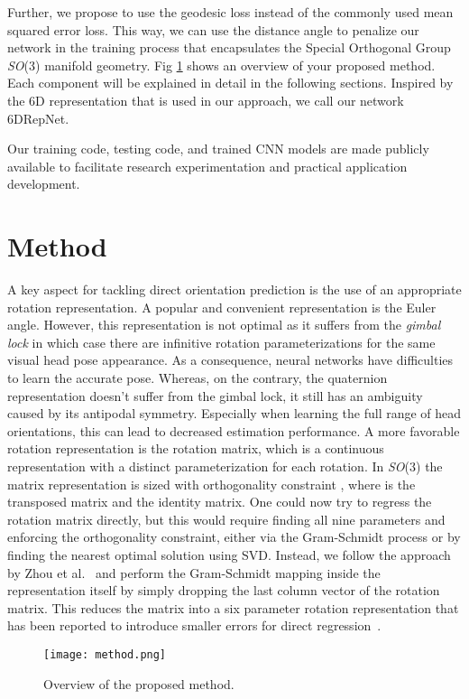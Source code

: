 \documentclass{article}
\newcommand\netname{6DRepNet}
\begin{document}
Further, we propose to use the geodesic loss instead of the commonly used mean squared error loss. This way, we can use the distance angle to penalize our network in the training process that encapsulates the Special Orthogonal Group \textit{SO}(3) manifold geometry. Fig \ref{fig:method} shows an overview of your proposed method. Each component will be explained in detail in the following sections. Inspired by the 6D representation that is used in our approach, we call our network \netname.

Our training code, testing code, and trained CNN models are made publicly available to facilitate research experimentation and practical application development.


\section{Method}
A key aspect for tackling direct orientation prediction is the use of an appropriate rotation representation. A popular and convenient representation is the Euler angle. However, this representation is not optimal as it suffers from the \textit{gimbal lock} in which case there are infinitive rotation parameterizations for the same visual head pose appearance. As a consequence, neural networks have difficulties to learn the accurate pose. Whereas, on the contrary, the quaternion representation doesn't suffer from the gimbal lock, it still has an ambiguity caused by its antipodal symmetry. Especially when learning the full range of head orientations, this can lead to decreased estimation performance. A more favorable rotation representation is the rotation matrix, which is a continuous representation with a distinct parameterization for each rotation. In \textit{SO}(3) the matrix representation  is sized  with orthogonality constraint , where  is the transposed matrix and  the identity matrix. One could now try to regress the rotation matrix directly, but this would require finding all nine parameters and enforcing the orthogonality constraint, either via the Gram-Schmidt process or by finding the nearest optimal solution using SVD. Instead, we follow the approach by Zhou et al.~\cite{Zhou2019OnTC} and perform the Gram-Schmidt mapping inside the representation itself by simply dropping the last column vector of the rotation matrix. This reduces the  matrix into a six parameter rotation representation that has been reported to introduce smaller errors for direct regression~\cite{Zhou2019OnTC}. 

\begin{figure}
    \centering
    \texttt{[image: method.png]}
    \caption{Overview of the proposed method.}
    \label{fig:method}
\end{figure}
\end{document}
